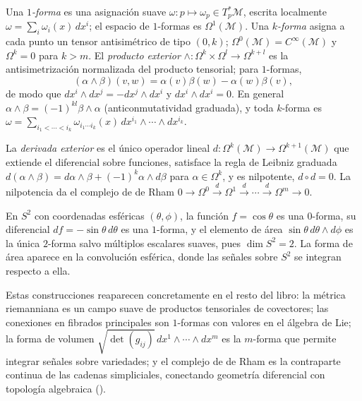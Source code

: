 \begin{definition}
\label{def:found:forms}
Una \emph{$1$-forma} es una asignaci\'on suave $\omega : p \mapsto \omega_p \in
T_p^*\mathcal{M}$, escrita localmente $\omega = \sum_i \omega_i(x)\, dx^i$; el
espacio de $1$-formas es $\Omega^1(\mathcal{M})$. Una \emph{$k$-forma} asigna a
cada punto un tensor antisim\'etrico de tipo $(0,k)$; $\Omega^0(\mathcal{M}) =
C^\infty(\mathcal{M})$ y $\Omega^k = 0$ para $k > m$. El \emph{producto exterior}
$\wedge : \Omega^k \times \Omega^l \to \Omega^{k+l}$ es la antisimetrizaci\'on
normalizada del producto tensorial; para $1$-formas,
\[
  (\alpha \wedge \beta)(v, w) = \alpha(v)\beta(w) - \alpha(w)\beta(v),
\]
de modo que $dx^i \wedge dx^j = -dx^j \wedge dx^i$ y $dx^i \wedge dx^i = 0$. En
general $\alpha \wedge \beta = (-1)^{kl}\beta \wedge \alpha$ (anticonmutatividad
graduada), y toda $k$-forma es $\omega = \sum_{i_1 < \cdots < i_k} \omega_{i_1\cdots
i_k}(x)\, dx^{i_1} \wedge \cdots \wedge dx^{i_k}$.
\end{definition}

\begin{definition}
\label{def:found:exterior-deriv}
La \emph{derivada exterior} es el \'unico operador lineal $d : \Omega^k(\mathcal{M})
\to \Omega^{k+1}(\mathcal{M})$ que extiende el diferencial sobre funciones, satisface
la regla de Leibniz graduada $d(\alpha \wedge \beta) = d\alpha \wedge \beta +
(-1)^k \alpha \wedge d\beta$ para $\alpha \in \Omega^k$, y es nilpotente, $d \circ d
= 0$. La nilpotencia da el complejo de de Rham $0 \to \Omega^0 \xrightarrow{d}
\Omega^1 \xrightarrow{d} \cdots \xrightarrow{d} \Omega^m \to 0$.
\end{definition}

\begin{example}
\label{ex:found:forms-sphere}
En $S^2$ con coordenadas esf\'ericas $(\theta, \phi)$, la funci\'on $f = \cos\theta$
es una $0$-forma, su diferencial $df = -\sin\theta\, d\theta$ es una $1$-forma, y el
elemento de \'area $\sin\theta\, d\theta \wedge d\phi$ es la \'unica $2$-forma salvo
m\'ultiplos escalares suaves, pues $\dim S^2 = 2$. La forma de \'area aparece en la
convoluci\'on esf\'erica, donde las se\~nales sobre $S^2$ se integran respecto a
ella.
\end{example}

Estas construcciones reaparecen concretamente en el resto del libro: la m\'etrica
riemanniana es un campo suave de productos tensoriales de covectores; las
conexiones en fibrados principales son $1$-formas con valores en el \'algebra de
Lie; la forma de volumen $\sqrt{\det(g_{ij})}\, dx^1 \wedge \cdots \wedge dx^m$ es
la $m$-forma que permite integrar se\~nales sobre variedades; y el complejo de de
Rham es la contraparte continua de las cadenas simpliciales, conectando geometr\'ia
diferencial con topolog\'ia algebraica ().

